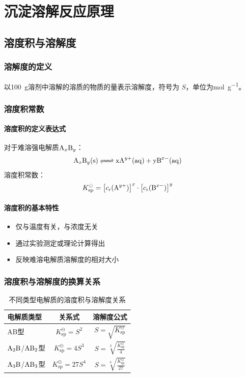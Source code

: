 \chapter{沉淀溶解反应原理}

\section{溶度积与溶解度}

\subsection{溶解度的定义}

以\SI{100}{\g}溶剂中溶解的溶质的物质的量表示溶解度，符号为 $S$，单位为\si{\mol\per\g}。

\subsection{溶度积常数}
\subsubsection{溶度积的定义表达式}
对于难溶强电解质$\ce{A_{x}B_{y}}$：
\[
\ce{A_{x}B_{y}(s) <=> xA^{y+}(aq) + yB^{x-}(aq)}
\]
溶度积常数：
\[
K_{\text{sp}}^{\ominus} = \left[ c_{\text{r}}(\ce{A^{y+}}) \right]^x \cdot \left[ c_{\text{r}}(\ce{B^{x-}}) \right]^y
\]

\subsubsection{溶度积的基本特性}
\begin{itemize}
    \item 仅与温度有关，与浓度无关
    \item 通过实验测定或理论计算得出
    \item 反映难溶电解质溶解度的相对大小
\end{itemize}

\subsection{溶度积与溶解度的换算关系}

\begin{table}[ht]
\centering
\caption*{不同类型电解质的溶度积与溶解度关系}
\begin{tabular}{lcc}
\toprule
电解质类型 & 关系式 & 溶解度公式 \\
\midrule
AB型 & $K_{\text{sp}}^{\ominus} = S^2$ & $\displaystyle S = \sqrt{K_{\text{sp}}^{\ominus}}$ \\
$\ce{A2B}$/$\ce{AB2}$型 & $K_{\text{sp}}^{\ominus} = 4S^3$ & $\displaystyle S = \sqrt[3]{\frac{K_{\text{sp}}^{\ominus}}{4}}$ \\
$\ce{A3B}$/$\ce{AB3}$型 & $K_{\text{sp}}^{\ominus} = 27S^4$ & $\displaystyle S = \sqrt[4]{\frac{K_{\text{sp}}^{\ominus}}{27}}$ \\
\bottomrule
\end{tabular}
\end{table}

